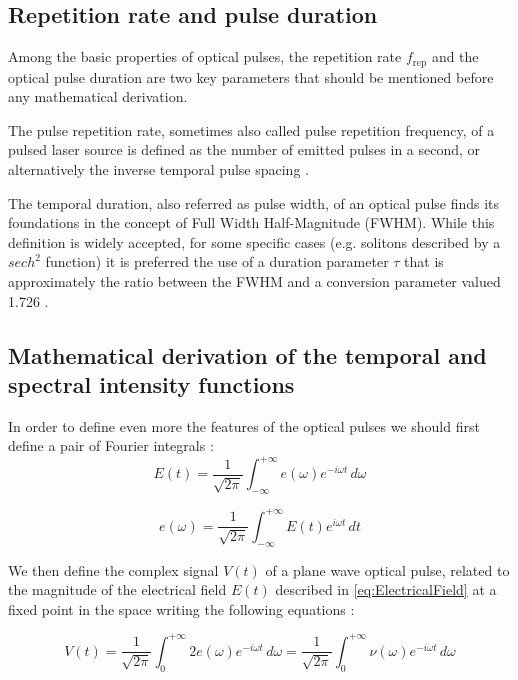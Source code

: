 \subsection{Repetition rate and pulse duration}
Among the basic properties of optical pulses, the repetition rate $f_{\text{rep}}$ and the optical pulse duration are two key parameters that should be mentioned before any mathematical derivation.

The pulse repetition rate, sometimes also called pulse repetition frequency, of a pulsed laser source is defined as the number of emitted pulses in a second, or alternatively the inverse temporal pulse spacing \cite{RP2005_rep_rate}.

The temporal duration, also referred as pulse width, of an optical pulse finds its foundations in the concept of Full Width Half-Magnitude (FWHM). While this definition is widely accepted, for some specific cases (e.g. solitons described by a $sech^2$ function) it is preferred the use of a duration parameter $\tau$ that is approximately the ratio between the FWHM and a conversion parameter valued 1.726 \cite{RP2005_duration}. 

\subsection{Mathematical derivation of the temporal and spectral intensity functions}
In order to define even more the features of the optical pulses we should first define a pair of Fourier integrals :
\begin{equation}
E(t) = \frac{1}{\sqrt{2\pi}}\int_{-\infty}^{+\infty} e(\omega)e^{-i\omega t}\, d\omega
\label{eq:ElectricalField}
\end{equation}

\begin{equation}
e(\omega) = \frac{1}{\sqrt{2\pi}}\int_{-\infty}^{+\infty} E(t)e^{i\omega t}\, dt
\label{eq:FT_Electrical}
\end{equation}

We then define the complex signal $V(t)$ of a plane wave optical pulse, related to the magnitude of the electrical field $E(t)$ described in \autoref{eq:ElectricalField} at a fixed point in the space writing the following equations :

\begin{equation}
V(t) = \frac{1}{\sqrt{2\pi}}\int_{0}^{+\infty} 2e(\omega)e^{-i\omega t}\, d\omega
= \frac{1}{\sqrt{2\pi}}\int_{0}^{+\infty} \nu(\omega)e^{-i\omega t}\, d\omega
\label{eq:OptPulse1}
\end{equation}

